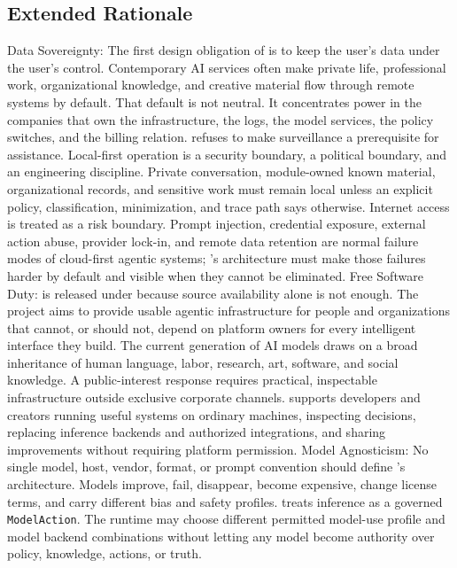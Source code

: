 \subsection{Extended Rationale}
\begin{itemize}
	\itembf Data Sovereignty:
	\subitem The first design obligation of \Madre is to keep the user's data under the user's control. Contemporary AI services often make private life, professional work, organizational knowledge, and creative material flow through remote systems by default. That default is not neutral. It concentrates power in the companies that own the infrastructure, the logs, the model services, the policy switches, and the billing relation.
	\subitem \Madre refuses to make surveillance a prerequisite for assistance. Local-first operation is a security boundary, a political boundary, and an engineering discipline. Private conversation, module-owned known material, organizational records, and sensitive work must remain local unless an explicit policy, classification, minimization, and trace path says otherwise.
	\subitem Internet access is treated as a risk boundary. Prompt injection, credential exposure, external action abuse, provider lock-in, and remote data retention are normal failure modes of cloud-first agentic systems; \Madre's architecture must make those failures harder by default and visible when they cannot be eliminated.
	\itembf Free Software Duty:
	\subitem \Madre is released under \texttt{\license} because source availability alone is not enough. The project aims to provide usable agentic infrastructure for people and organizations that cannot, or should not, depend on platform owners for every intelligent interface they build.
	\subitem The current generation of AI models draws on a broad inheritance of human language, labor, research, art, software, and social knowledge. A public-interest response requires practical, inspectable infrastructure outside exclusive corporate channels.
	\subitem \Madre supports developers and creators running useful systems on ordinary machines, inspecting decisions, replacing inference backends and authorized integrations, and sharing improvements without requiring platform permission.
	\itembf Model Agnosticism:
	\subitem No single model, host, vendor, format, or prompt convention should define \Madre's architecture. Models improve, fail, disappear, become expensive, change license terms, and carry different bias and safety profiles.
	\subitem \Madre treats inference as a governed \texttt{ModelAction}. The runtime may choose different permitted model-use profile and model backend combinations without letting any model become authority over policy, knowledge, actions, or truth.

\end{itemize}

